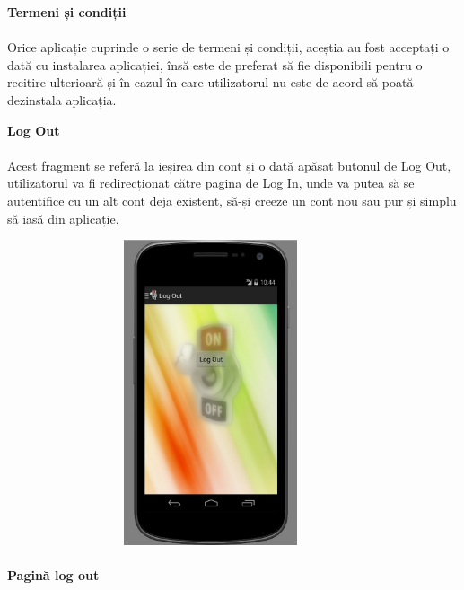 \textbf{Termeni și condiții}
\paragraph{ } Orice aplicație cuprinde o serie de termeni și condiții, aceștia au fost acceptați o dată cu instalarea aplicației, însă este de preferat să fie disponibili pentru o recitire ulterioară și în cazul în care utilizatorul nu este de acord să poată dezinstala aplicația.


\textbf{Log Out}
\paragraph{ } Acest fragment se referă la ieșirea din cont și o dată apăsat butonul de Log Out, utilizatorul va fi redirecționat către pagina de Log In, unde va putea să se autentifice cu un alt cont deja existent, să-și creeze un cont nou sau pur și simplu să iasă din aplicație.
\begin{center}
\includegraphics[width=12cm,height=9cm,keepaspectratio]{imagini/logout.eps} %
\paragraph{}
\textbf{Pagină log out}
\end{center}




